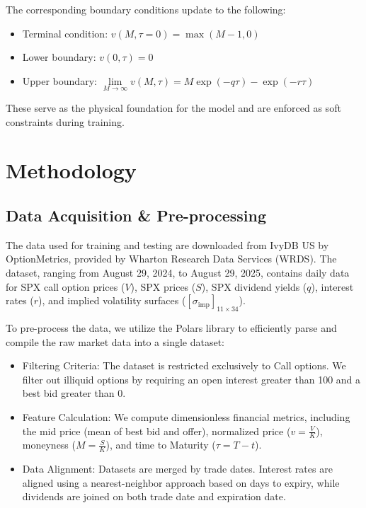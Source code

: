 \documentclass[a4paper,fleqn]{cas-sc}
\begin{document}
The corresponding boundary conditions update to the following:
\begin{itemize}[nosep]
    \item Terminal condition: $v(M,\tau = 0)=\max(M-1,0)$
    \item Lower boundary: $v(0,\tau)=0$
    \item Upper boundary: $\lim\limits_{M\rightarrow\infty} v(M,\tau)=M\exp(-q\tau)-\exp(-r\tau)$
\end{itemize}

These serve as the physical foundation for the model and are enforced as soft constraints during training.


\vspace{-10pt}\section{Methodology}

\vspace{-5pt}\subsection{Data Acquisition \& Pre-processing}
The data used for training and testing are downloaded from IvyDB US by OptionMetrics, provided by Wharton Research Data Services (WRDS). The dataset, ranging from August 29, 2024, to August 29, 2025, contains daily data for SPX call option prices ($V$), SPX prices ($S$), SPX dividend yields ($q$), interest rates ($r$), and implied volatility surfaces ($[\sigma_{\text{imp}}]_{11\times34}$). 

To pre-process the data, we utilize the Polars library to efficiently parse and compile the raw market data into a single dataset:
\begin{itemize}[nosep]
    \item {Filtering Criteria:} The dataset is restricted exclusively to Call options. We filter out illiquid options by requiring an open interest greater than 100 and a best bid greater than 0.
    \item {Feature Calculation:} We compute dimensionless financial metrics, including the mid price (mean of best bid and offer), normalized price ($v=\frac{V}{K}$), moneyness ($M=\frac{S}{K}$), and time to Maturity ($\tau = T-t$).
    \item {Data Alignment:} Datasets are merged by trade dates. Interest rates are aligned using a nearest-neighbor approach based on days to expiry, while dividends are joined on both trade date and expiration date.
\end{itemize}
\end{document}
